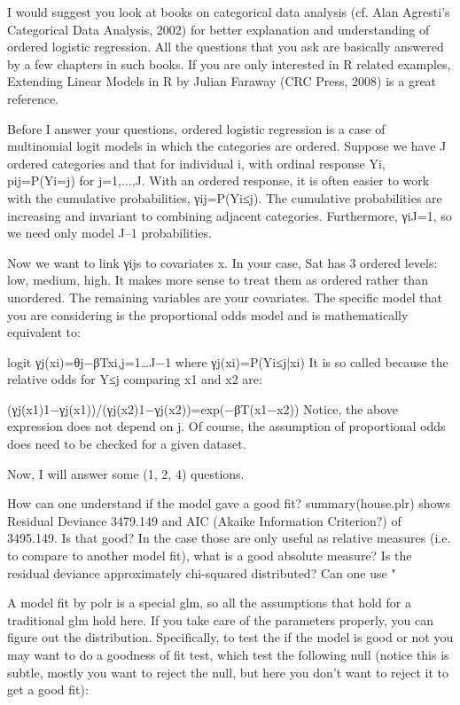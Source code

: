 I would suggest you look at books on categorical data analysis (cf. Alan Agresti's Categorical Data Analysis, 2002) for better explanation and understanding of ordered logistic regression. All the questions that you ask are basically answered by a few chapters in such books. If you are only interested in R related examples, Extending Linear Models in R by Julian Faraway (CRC Press, 2008) is a great reference.

Before I answer your questions, ordered logistic regression is a case of multinomial logit models in which the categories are ordered. Suppose we have J ordered categories and that for individual i, with ordinal response Yi, pij=P(Yi=j) for j=1,...,J. With an ordered response, it is often easier to work with the cumulative probabilities, γij=P(Yi≤j). The cumulative probabilities are increasing and invariant to combining adjacent categories. Furthermore, γiJ=1, so we need only model J–1 probabilities.

Now we want to link γijs to covariates x. In your case, Sat has 3 ordered levels: low, medium, high. It makes more sense to treat them as ordered rather than unordered. The remaining variables are your covariates. The specific model that you are considering is the proportional odds model and is mathematically equivalent to:

logit γj(xi)=θj−βTxi,j=1…J−1
where γj(xi)=P(Yi≤j|xi)
It is so called because the relative odds for Y≤j comparing x1 and x2 are:

(γj(x1)1−γj(x1))/(γj(x2)1−γj(x2))=exp(−βT(x1−x2))
Notice, the above expression does not depend on j. Of course, the assumption of proportional odds does need to be checked for a given dataset.

Now, I will answer some (1, 2, 4) questions.

How can one understand if the model gave a good fit? summary(house.plr) shows Residual Deviance 3479.149 and AIC (Akaike Information Criterion?) of 3495.149. Is that good? In the case those are only useful as relative measures (i.e. to compare to another model fit), what is a good absolute measure? Is the residual deviance approximately chi-squared distributed? Can one use "%

A model fit by polr is a special glm, so all the assumptions that hold for a traditional glm hold here. If you take care of the parameters properly, you can figure out the distribution. Specifically, to test the if the model is good or not you may want to do a goodness of fit test, which test the following null (notice this is subtle, mostly you want to reject the null, but here you don't want to reject it to get a good fit):

